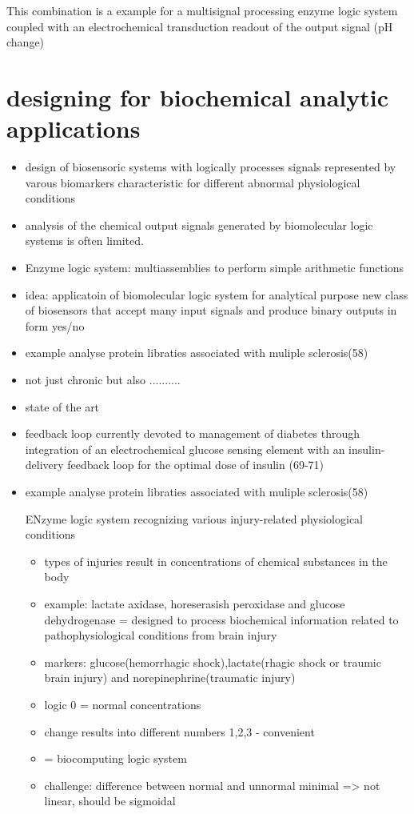 \documentclass[runningheads]{llncs}
\begin{document}
	
This combination is a example for a multisignal processing enzyme logic system coupled with an electrochemical transduction readout of the output signal (pH change)
\section{designing for biochemical analytic applications}
	\begin{itemize}
		\item design of biosensoric systems with logically processes signals represented by varous biomarkers characteristic for different abnormal physiological conditions
		\item analysis of the chemical output signals generated by biomolecular logic systems is often limited.
		\item Enzyme logic system: multiassemblies to perform simple arithmetic functions
		\item idea: applicatoin of biomolecular logic system for analytical purpose new class of biosensors that accept many input signals and produce binary outputs in form yes/no 
		\item example analyse protein libraties associated with muliple sclerosis(58)
	\end{itemize}

	\begin{itemize}
		\item not just chronic but also ..........
		\item state of the art
		\item feedback loop currently devoted to management of diabetes through integration of an electrochemical glucose sensing element with an insulin-delivery feedback loop for the optimal dose of insulin (69-71)
		\item example analyse protein libraties associated with muliple sclerosis(58)
		
		ENzyme logic system recognizing various injury-related physiological conditions
		\begin{itemize}
			\item types of injuries result in concentrations of chemical substances in the body
			
			\item example: lactate axidase, horeserasish peroxidase and glucose dehydrogenase = designed to process biochemical information related to pathophysiological conditions from brain injury
			\item markers: glucose(hemorrhagic shock),lactate(rhagic shock or traumic brain injury) and norepinephrine(traumatic injury)
			\item logic 0 = normal concentrations
			\item change results into different numbers 1,2,3 - convenient
			\item = biocomputing logic system 
			\item challenge: difference between normal and unnormal minimal => not linear, should be sigmoidal	
		\end{itemize}
	\end{itemize}
\end{document}
